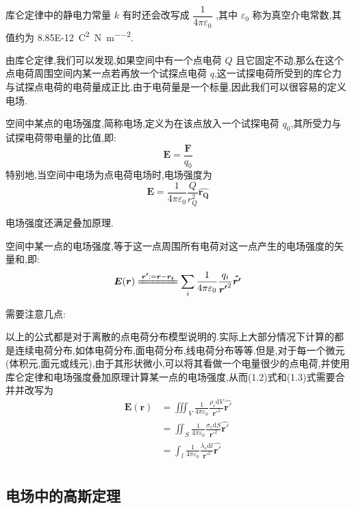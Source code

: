\documentclass[UTF8]{ctexbook}
\newcommand{\vp}{\varepsilon_0}
\newcommand{\D}{\text{d}}
\begin{document}
库仑定律中的静电力常量 $k$ 有时还会改写成 $\dfrac{1}{4\pi\vp}$ ,其中 $\vp$ 称为真空介电常数,其值约为 \SI{8.85E-12}{\square\coulomb\per\newton\per\square\meter}.

由库仑定律,我们可以发现,如果空间中有一个点电荷 $Q$ 且它固定不动,那么在这个点电荷周围空间内某一点若再放一个试探点电荷 $q$,这一试探电荷所受到的库仑力与试探点电荷的电荷量成正比.由于电荷量是一个标量,因此我们可以很容易的定义电场.

\begin{definition}
    空间中某点的电场强度,简称电场,定义为在该点放入一个试探电荷 $q_0$,其所受力与试探电荷带电量的比值,即:
    \begin{equation}
        \boldsymbol{E} = \frac{\boldsymbol{F}}{q_0}
    \end{equation}
    特别地,当空间中电场为点电荷电场时,电场强度为
    \[\boldsymbol{E} = \frac{1}{4\pi\vp}\frac{Q}{r_Q^2}\boldsymbol{\hat{r_Q}}\]
\end{definition}

电场强度还满足叠加原理.

\begin{principle}
    空间中某一点的电场强度,等于这一点周围所有电荷对这一点产生的电场强度的矢量和,即:
    \begin{equation}
        \boldsymbol{E}(\boldsymbol{r})\xlongequal{\boldsymbol{r'}:=\boldsymbol{r}-\boldsymbol{r_i}}\sum_i \frac{1}{4\pi\vp}\frac{q_i}{\boldsymbol{r'}^2}\boldsymbol{\hat{r'}}
    \end{equation}
\end{principle}

需要注意几点:

以上的公式都是对于离散的点电荷分布模型说明的.实际上大部分情况下计算的都是连续电荷分布,如体电荷分布,面电荷分布,线电荷分布等等.但是,对于每一个微元(体积元,面元或线元),由于其形状微小,可以将其看做一个电量很少的点电荷,并使用库仑定律和电场强度叠加原理计算某一点的电场强度,从而(1.2)式和(1.3)式需要合并并改写为
\begin{align*}
    \boldsymbol{E}(\boldsymbol{r})&=\iiint_V \frac{1}{4\pi\vp} \frac{\rho_e\D V}{\boldsymbol{r'}^2}\boldsymbol{\hat{r'}} \\
    &=\iint_S \frac{1}{4\pi\vp} \frac{\sigma_e\D S}{\boldsymbol{r'}^2}\boldsymbol{\hat{r'}} \\
    &=\int_l \frac{1}{4\pi\vp} \frac{\lambda_e\D l}{\boldsymbol{r'}^2}\boldsymbol{\hat{r'}} \\
\end{align*}

\subsection{电场中的高斯定理}
\end{document}
